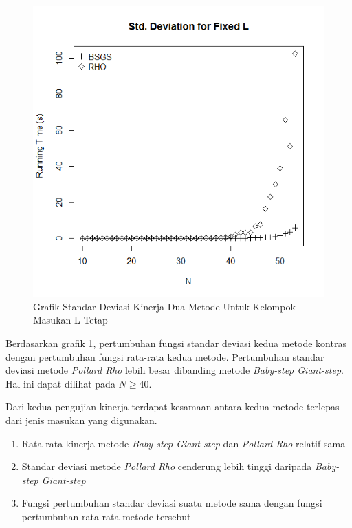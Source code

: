 \begin{figure}[h!]
	\Centering
	\includegraphics[angle=0, scale=0.55]{bab5/img/sdev-fixed-l}
	\caption{Grafik Standar Deviasi Kinerja Dua Metode Untuk Kelompok Masukan L Tetap}
	\label{fig:stddev_fixed_l}
\end{figure}

Berdasarkan grafik \ref{fig:stddev_fixed_l}, pertumbuhan fungsi standar deviasi kedua metode kontras dengan pertumbuhan fungsi rata-rata kedua metode. Pertumbuhan standar deviasi metode \textit{Pollard Rho} lebih besar dibanding metode \textit{Baby-step Giant-step}. Hal ini dapat dilihat pada $ N \geq 40 $.

Dari kedua pengujian kinerja terdapat kesamaan antara kedua metode terlepas dari jenis masukan yang digunakan.

\begin{enumerate}
	\item Rata-rata kinerja metode \textit{Baby-step Giant-step} dan \textit{Pollard Rho} relatif sama
	\item Standar deviasi metode \textit{Pollard Rho} cenderung lebih tinggi daripada \textit{Baby-step Giant-step}
	\item Fungsi pertumbuhan standar deviasi suatu metode sama dengan fungsi pertumbuhan rata-rata metode tersebut
\end{enumerate}

